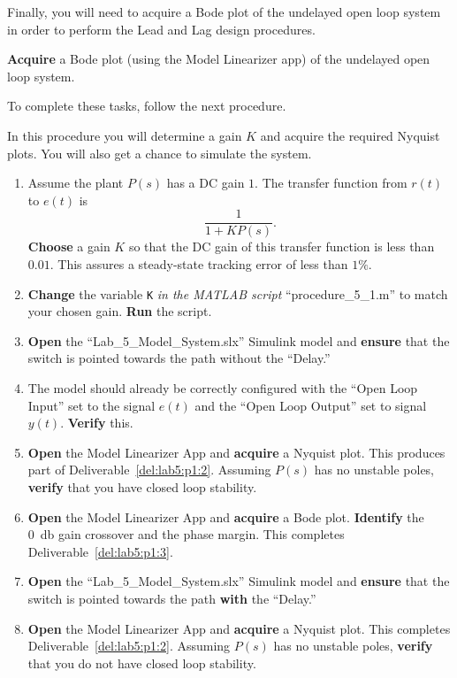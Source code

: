 %
Finally, you will need to acquire a Bode plot of the undelayed open loop system in order to perform the Lead and Lag design procedures.
%
\begin{deliverable}[label={del:lab5:p1:3}]
  \textbf{Acquire} a Bode plot (using the Model Linearizer app) of the undelayed open loop system.
\end{deliverable}
%
To complete these tasks, follow the next procedure.
%
\begin{procedure}[label={proc:lab5:1}]
  In this procedure you will determine a gain \(K\) and acquire the required Nyquist plots.
  You will also get a chance to simulate the system.
  \begin{enumerate}[label={(\arabic*)}]
    \item{%
      Assume the plant \(P(s)\) has a DC gain \(1.\)
      The transfer function from \(r(t)\) to \(e(t)\) is
      \[
        \frac{1}{1 + K P(s)}.
      \]
      \textbf{Choose} a gain \(K\) so that the DC gain of this transfer function is less than \(0.01.\)
      This assures a steady-state tracking error of less than \(1\%.\)
    }
    \item{%
      \textbf{Change} the variable \texttt{K} \emph{in the MATLAB script} ``procedure\_5\_1.m'' to match your chosen gain.
      \textbf{Run} the script.
    }
    \item{%
      \textbf{Open} the ``Lab\_5\_Model\_System.slx'' Simulink model and \textbf{ensure} that the switch is pointed towards the path without the ``Delay.''
    }
    \item{%
      The model should already be correctly configured with the ``Open Loop Input'' set to the signal \(e(t)\) and the ``Open Loop Output'' set to signal \(y(t).\)
      \textbf{Verify} this.
    }
    \item{%
      \textbf{Open} the Model Linearizer App and \textbf{acquire} a Nyquist plot.
      This produces part of Deliverable~\ref{del:lab5:p1:2}.
      Assuming \(P(s)\) has no unstable poles, \textbf{verify} that you have closed loop stability.
    }
    \item{%
      \textbf{Open} the Model Linearizer App and \textbf{acquire} a Bode plot.
      \textbf{Identify} the \SI{0}{\decibel} gain crossover and the phase margin.
      This completes Deliverable~\ref{del:lab5:p1:3}.
    }
    \item{%
      \textbf{Open} the ``Lab\_5\_Model\_System.slx'' Simulink model and \textbf{ensure} that the switch is pointed towards the path \textbf{with} the ``Delay.''
    }
    \item{%
      \textbf{Open} the Model Linearizer App and \textbf{acquire} a Nyquist plot.
      This completes Deliverable~\ref{del:lab5:p1:2}.
      Assuming \(P(s)\) has no unstable poles, \textbf{verify} that you do not have closed loop stability.
    }
  \end{enumerate}
\end{procedure}

